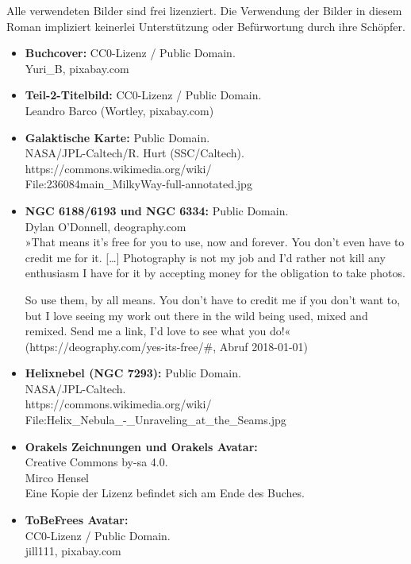 Alle verwendeten Bilder sind frei lizenziert. Die Verwendung der Bilder in diesem Roman impliziert keinerlei Unterstützung oder Befürwortung durch ihre Schöpfer.

\begin{itemize}
	\item \textbf{Buchcover:} CC0-Lizenz / Public Domain.\\ Yuri\_B, pixabay.com
	\item \textbf{Teil-2-Titelbild:} CC0-Lizenz / Public Domain.\\ Leandro Barco (Wortley, pixabay.com)
	\item \textbf{Galaktische Karte:} Public Domain.\\ NASA/JPL-Caltech/R. Hurt (SSC/Caltech).\\ https://commons.wikimedia.org/wiki/\\File:236084main\_MilkyWay-full-annotated.jpg
	\item \textbf{NGC 6188/6193 und NGC 6334:} Public Domain.\\ Dylan O'Donnell, deography.com\\ »That means it’s free for you to use, now and forever. You don’t even have to credit me for it. […] Photography is not my job and I’d rather not kill any enthusiasm I have for it by accepting money for the obligation to take photos.

So use them, by all means. You don’t have to credit me if you don’t want to, but I love seeing my work out there in the wild being used, mixed and remixed. Send me a link, I’d love to see what you do!« (https://deography.com/yes-its-free/\#, Abruf 2018-01-01)
	\item \textbf{Helixnebel (NGC 7293):} Public Domain.\\ NASA/JPL-Caltech.\\https://commons.wikimedia.org/wiki/\\File:Helix\_Nebula\_-\_Unraveling\_at\_the\_Seams.jpg
	\item \textbf{Orakels Zeichnungen und Orakels Avatar:}\\ Creative Commons by-sa 4.0.\\ Mirco Hensel\\Eine Kopie der Lizenz befindet sich am Ende des Buches.
	\item \textbf{ToBeFrees Avatar:}\\ CC0-Lizenz / Public Domain.\\ jill111, pixabay.com
\end{itemize}

